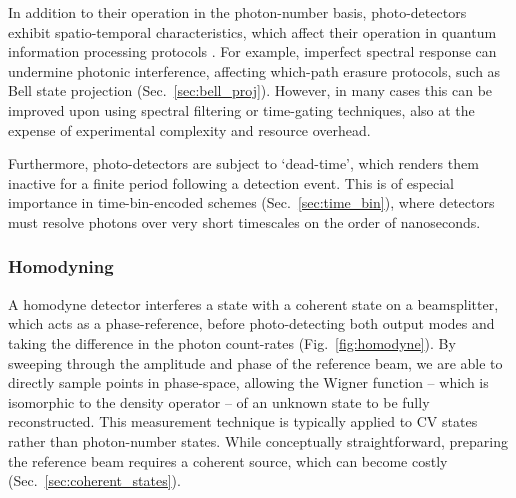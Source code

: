 \documentclass[aps,rmp,twocolumn,amsmath,amssymb,nofootinbib,superscriptaddress,longbibliography,floatfix,table-of-contents,eqsecnum]{revtex4-1}
\begin{document}
In addition to their operation in the photon-number basis, photo-detectors exhibit spatio-temporal characteristics, which affect their operation in quantum information processing protocols \cite{RohdePDReview}. For example, imperfect spectral response can undermine photonic interference, affecting which-path erasure protocols, such as Bell state projection (Sec.~\ref{sec:bell_proj}). However, in many cases this can be improved upon using spectral filtering or time-gating techniques, also at the expense of experimental complexity and resource overhead.

Furthermore, photo-detectors are subject to `dead-time', which renders them inactive for a finite period following a detection event. This is of especial importance in time-bin-encoded schemes (Sec.~\ref{sec:time_bin}), where detectors must resolve photons over very short timescales on the order of nanoseconds.

%
%

\subsubsection{Homodyning} \label{sec:homodyne} 

A homodyne detector interferes a state with a coherent state on a beamsplitter, which acts as a phase-reference, before photo-detecting both output modes and taking the difference in the photon count-rates (Fig.~\ref{fig:homodyne}). By sweeping through the amplitude and phase of the reference beam, we are able to directly sample points in phase-space, allowing the Wigner function -- which is isomorphic to the density operator -- of an unknown state to be fully reconstructed. This measurement technique is typically applied to CV states rather than photon-number states. While conceptually straightforward, preparing the reference beam requires a coherent source, which can become costly (Sec.~\ref{sec:coherent_states}).
\end{document}

